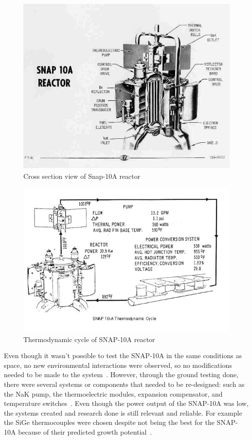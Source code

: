 \documentclass{article}
\begin{document}
\begin{figure}[]
	\centering
	\includegraphics[height=0.45\textheight]{fig/appC}
	\caption[Cross section view of Snap-10A reactor]{Cross section view of Snap-10A reactor~\cite{websnap}}
	\label{appC}
\end{figure}


\begin{figure}[]
	\centering
	\includegraphics[height=0.45\textheight]{fig/appD}
	\caption[Thermodynamic cycle of SNAP-10A reactor]{Thermodynamic cycle of SNAP-10A reactor~\cite{websnap}}
	\label{appD}
\end{figure}



Even though it wasn't possible to test the SNAP-10A in the same conditions as space, no new environmental interactions were observed, so no modifications needed to be made to the system~\cite{ohlenkamp1966snap}. However, through the ground testing done, there were several systems or components that needed to be re-designed: such as the NaK pump, the thermoelectric modules, expansion compensator, and temperature switches~\cite{voss1984snap}. Even though the power output of the SNAP-10A was low, the systems created and research done is still relevant and reliable. For example the SiGe thermocouples were chosen despite not being the best for the SNAP-10A because of their predicted growth potential~\cite{voss1984snap}. 
\end{document}
